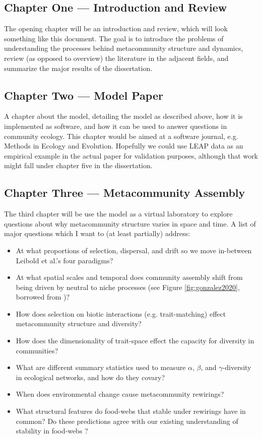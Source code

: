 \documentclass[]{article}
\begin{document}
\subsection*{Chapter One --- Introduction and Review}

The opening chapter will be an introduction and review, which will look something like this document. The goal is to introduce the problems of understanding the processes behind metacommunity structure and dynamics, review (as opposed to overview) the literature in the adjacent fields, and summarize the major results of the dissertation.

\subsection*{Chapter Two --- Model Paper}

A chapter about the model, detailing the model as described above, how it is implemented as software, and how it can be used to answer questions in community ecology. This chapter would be aimed at a software journal, e.g. Methods in Ecology and Evolution. Hopefully we could use LEAP data as an empirical example in the actual paper for validation purposes, although that work might fall under chapter five in the dissertation.


\subsection*{Chapter Three  --- Metacommunity Assembly}

The third chapter will be use the model as a virtual laboratory to explore questions about why metacommunity structure varies in space and time. A list of major questions which I want to (at least partially) address:

\begin{itemize}
    \item At what proportions of selection, dispersal, and drift so we move in-between Leibold et al.'s four paradigms?
    \item At what spatial scales and temporal does community assembly shift from being driven by neutral to niche processes (see Figure \ref{fig:gonzalez2020}, borrowed from \cite{gonzalez_scaling-up_2020})?
    \item How does selection on biotic interactions (e.g. trait-matching) effect metacommunity structure and diversity?
    \item How does the dimensionality of trait-space effect the capacity for diversity in communities?
    \item What are different summary statistics used to measure $\alpha$, $\beta$, and $\gamma$-diversity in ecological networks, and how do they covary?
    \item When does environmental change cause metacommunity rewirings?
    \item What structural features do food-webs that stable under rewirings have in common? Do these predictions agree with our existing understanding of stability in food-webs     \cite{allesina_stability_2012}?

\end{itemize}
\end{document}

